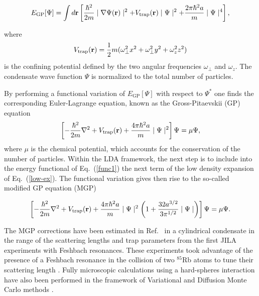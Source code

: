 \begin{equation}
  E_{\mathrm{GP}} [\Psi] = \int d{\bf r} \left [ \frac {\hbar^2 }{2m} \mid \nabla
  \Psi({\bf r}) \mid^2 + V_{\mathrm{trap}}({\bf r})\mid \Psi \mid ^2+ \frac {2 \pi
  \hbar^2 a }{m}\mid \Psi \mid ^4 \right ],
\label{func1}
\end{equation}

where 
\begin{equation}
  V_{\mathrm{trap}}({\bf r}) = \frac {1}{2} m (\omega_{\bot}^2 x^2 
  + \omega_{\bot}^2 y^2 +\omega_{z}^2 z^2 ) 
\label{trap}
\end{equation}
is the confining potential defined by the two angular frequencies
$\omega_{\bot}$ and $\omega_{z}$.
The condensate 
wave function $\Psi$ is
normalized to the total number of particles. 

By performing a functional variation of $E_{\mathrm{GP}}[\Psi]$ with respect
to $\Psi^*$ one finds the corresponding Euler-Lagrange equation, 
known as the Gross-Pitaevskii (GP) equation
\begin{equation}
  \left [ - \frac {\hbar^2}{2m} \nabla^2 + V_{\mathrm{trap}}({\bf r}) + 
   \frac{4\pi\hbar^2 a}{m} \mid \Psi \mid^2 \right ]\Psi=\mu\Psi , 
\label{gp1} 
\end{equation}
where $\mu$ is the chemical potential, which accounts for the conservation
of the number of particles. Within the 
LDA framework, the next step 
is to include into the energy functional of Eq.~(\ref{func1})
the next term of the low density expansion of Eq.~(\ref{low-ex}). 
The functional variation gives then rise to the so-called 
modified GP equation (MGP) \cite{fabro99} 

\begin{equation}
  \left [ - \frac {\hbar^2}{2m} \nabla^2 + V_{\mathrm{trap}}({\bf r})+\frac {4 \pi \hbar^2 a}{m} \mid \Psi \mid^2 
    \left (1 + \frac {32 a^{3/2}}{3 \pi^{1/2}} \mid \Psi\mid \right)
    \right ] \Psi =  \mu \Psi .
\label{gp2}
\end{equation}

The MGP corrections have been estimated in  Ref.~\cite{fabro99} in a cylindrical 
condensate in the range of the scattering lengths and trap parameters
from the first JILA experiments with Feshbach resonances. These experiments took 
advantage of the  presence of a Feshbach resonance in the collision of two
$^{85}$Rb atoms to tune their scattering length \cite{cornish00}.
Fully microscopic calculations using  a hard-spheres interaction have
also been performed in the framework of Variational and Diffusion Monte
Carlo methods \cite{dubois2001,glyde2002,glyde2003,blume1}. 


